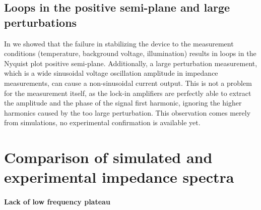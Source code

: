 \subsection{Loops in the positive semi-plane and large perturbations}\label{impedance-large_perturbations}
In  we showed that the failure in stabilizing the device to the measurement conditions (temperature, background voltage, illumination) results in loops in the Nyquist plot positive semi-plane.
Additionally, a large perturbation measurement, which is a wide sinusoidal voltage oscillation amplitude in impedance measurements, can cause a non-sinusoidal current output.
This is not a problem for the measurement itself, as the lock-in amplifiers are perfectly able to extract the amplitude and the phase of the signal first harmonic, ignoring the higher harmonics caused by the too large perturbation.
This observation comes merely from simulations, no experimental confirmation is available yet.

\begin{figure}
\end{figure}


\section{Comparison of simulated and experimental impedance spectra}


\paragraph{Lack of low frequency plateau}

